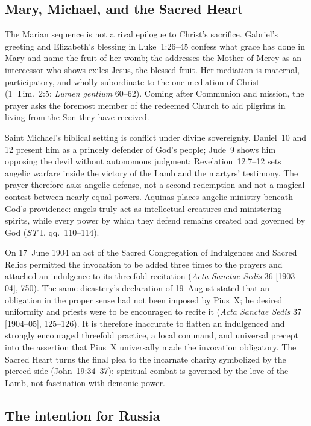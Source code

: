 \subsection*{Mary, Michael, and the Sacred Heart}

The Marian sequence is not a rival epilogue to Christ's sacrifice. Gabriel's greeting and Elizabeth's blessing in Luke~1:26--45 confess what grace has done in Mary and name the fruit of her womb; the  addresses the Mother of Mercy as an intercessor who shows exiles Jesus, the blessed fruit. Her mediation is maternal, participatory, and wholly subordinate to the one mediation of Christ (1~Tim.~2:5; \emph{Lumen gentium} 60--62). Coming after Communion and mission, the prayer asks the foremost member of the redeemed Church to aid pilgrims in living from the Son they have received.

Saint Michael's biblical setting is conflict under divine sovereignty. Daniel~10 and 12 present him as a princely defender of God's people; Jude~9 shows him opposing the devil without autonomous judgment; Revelation~12:7--12 sets angelic warfare inside the victory of the Lamb and the martyrs' testimony. The prayer therefore asks angelic defense, not a second redemption and not a magical contest between nearly equal powers. Aquinas places angelic ministry beneath God's providence: angels truly act as intellectual creatures and ministering spirits, while every power by which they defend remains created and governed by God (\emph{ST} I, qq.~110--114).

On 17~June 1904 an act of the Sacred Congregation of Indulgences and Sacred Relics permitted the invocation  to be added three times to the prayers and attached an indulgence to its threefold recitation (\emph{Acta Sanctae Sedis} 36 [1903--04], 750). The same dicastery's declaration of 19~August stated that an obligation in the proper sense had not been imposed by Pius~X; he desired uniformity and priests were to be encouraged to recite it (\emph{Acta Sanctae Sedis} 37 [1904--05], 125--126). It is therefore inaccurate to flatten an indulgenced and strongly encouraged threefold practice, a local command, and universal precept into the assertion that Pius~X universally made the invocation obligatory. The Sacred Heart turns the final plea to the incarnate charity symbolized by the pierced side (John~19:34--37): spiritual combat is governed by the love of the Lamb, not fascination with demonic power.

\subsection*{The intention for Russia}

